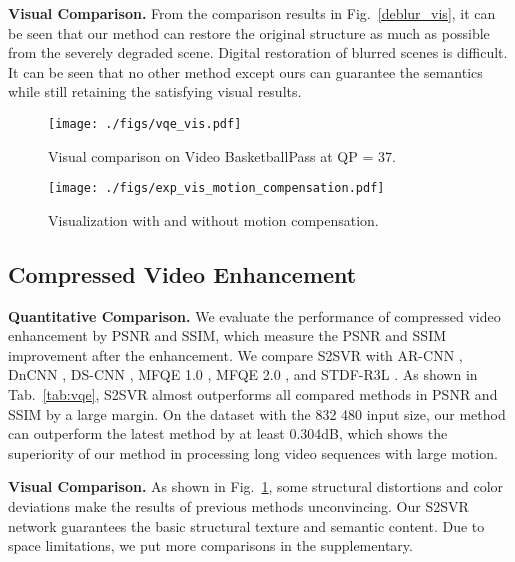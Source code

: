\documentclass[nohyperref]{article}
\theoremstyle{plain}
\theoremstyle{definition}
\theoremstyle{remark}
\begin{document}
\vspace{-1mm}
\noindent\textbf{Visual Comparison.} From the comparison results in Fig.~\ref{deblur_vis}, it can be seen that our method can restore the original structure as much as possible from the severely degraded scene. Digital restoration of blurred scenes is difficult. It can be seen that no other method except ours can guarantee the semantics while still retaining the satisfying visual results.


\begin{figure}
\texttt{[image: ./figs/vqe\_vis.pdf]}
    \vspace{-4.5mm}
    \caption{Visual comparison on Video BasketballPass at QP = 37.}
\label{compress_vis}
\vspace{-3mm}
\end{figure}

\begin{figure}
\vspace{-2mm} 
\texttt{[image: ./figs/exp\_vis\_motion\_compensation.pdf]}
    \vspace{-4.5mm}
    \caption{Visualization with and without motion compensation.}
\label{motion_compensation}
\vspace{-7mm}
\end{figure}

\vspace{-3mm}
\subsection{Compressed Video Enhancement}
\vspace{-2mm}
\noindent\textbf{Quantitative Comparison.}
We evaluate the performance of compressed video enhancement by PSNR and SSIM, which measure the PSNR and SSIM improvement after the enhancement. We compare S2SVR with AR-CNN \cite{dong2015compression}, DnCNN \cite{Zhang2017Beyond}, DS-CNN \cite{yang2018enhancing}, MFQE 1.0 \cite{r13}, MFQE 2.0 \cite{r12}, and STDF-R3L \cite{deng2020spatio}. As shown in Tab.~\ref{tab:vqe}, S2SVR almost outperforms all compared methods in PSNR and SSIM by a large margin. On the  dataset with the 832 480 input size, our method can outperform the latest method by at least 0.304dB, which shows the superiority of our method in processing long video sequences with large motion. 
\vspace{-1mm}

\noindent\textbf{Visual Comparison.} As shown in Fig.~\ref{compress_vis}, some structural distortions and color deviations make the results of previous methods unconvincing. Our S2SVR network guarantees the basic structural texture and semantic content. Due to space limitations, we put more comparisons in the supplementary.
\end{document}
